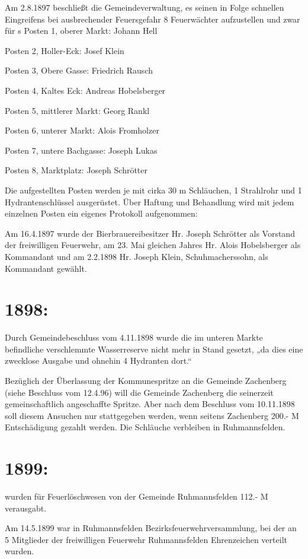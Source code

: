 \documentclass[12pt,a4paper]{book}
\begin{document}
Am 2.8.1897 beschließt die Gemeindeverwaltung, es seinen in Folge schnellen
Eingreifens bei ausbrechender Feuersgefahr 8 Feuerwächter aufzustellen und zwar
für
s
Posten 1, oberer Markt: Johann Hell

Posten 2, Holler-Eck: Josef Klein

Posten 3, Obere Gasse: Friedrich Rausch

Posten 4, Kaltes Eck: Andreas Hobelsberger

Posten 5, mittlerer Markt: Georg Rankl

Posten 6, unterer Markt: Alois Fromholzer

Posten 7, untere Bachgasse: Joseph Lukas

Posten 8, Marktplatz: Joseph Schrötter

Die aufgestellten Posten werden je mit cirka 30 m Schläuchen, 1 Strahlrohr und 1
Hydrantenschlüssel ausgerüstet. Über Haftung und Behandlung wird mit jedem
einzelnen Posten ein eigenes Protokoll aufgenommen:

Am 16.4.1897 wurde der Bierbrauereibesitzer Hr. Joseph Schrötter als Vorstand
der freiwilligen Feuerwehr, am 23. Mai gleichen Jahres Hr. Alois Hobelsberger
als Kommandant und am 2.2.1898 Hr. Joseph Klein, Schuhmacherssohn, als
Kommandant gewählt.

\section{1898:}

Durch Gemeindebeschluss vom 4.11.1898 wurde die im unteren Markte befindliche
verschlemmte Wasserreserve nicht mehr in Stand gesetzt, „da dies eine zwecklose
Ausgabe und ohnehin 4 Hydranten dort.“

Bezüglich der Überlassung der Kommunespritze an die Gemeinde Zachenberg (siehe
Beschluss vom 12.4.96) will die Gemeinde Zachenberg die seinerzeit
gemeinschaftlich angeschaffte Spritze. Aber nach dem Beschluss vom 10.11.1898
soll diesem Ansuchen nur stattgegeben werden, wenn seitens Zachenberg 200.- M
Entschädigung gezahlt werden. Die Schläuche verbleiben in Ruhmannsfelden.

\section{1899:}

wurden für Feuerlöschwesen von der Gemeinde Ruhmannsfelden 112.- M verausgabt.

Am 14.5.1899 war in Ruhmannsfelden Bezirksfeuerwehrversammlung, bei der an 5
Mitglieder der freiwilligen Feuerwehr Ruhmannsfelden Ehrenzeichen verteilt
wurden.
\end{document}
